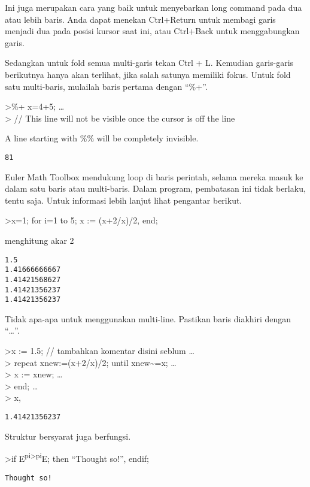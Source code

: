 \documentclass[
]{book}
\begin{document}
Ini juga merupakan cara yang baik untuk menyebarkan long command pada dua atau lebih baris. Anda dapat menekan Ctrl+Return untuk membagi garis menjadi dua pada posisi kursor saat ini, atau Ctrl+Back untuk menggabungkan garis.

Sedangkan untuk fold semua multi-garis tekan Ctrl + L. Kemudian garis-garis berikutnya hanya akan terlihat, jika salah satunya memiliki fokus. Untuk fold satu multi-baris, mulailah baris pertama dengan ``\%+''.

\textgreater\%+ x=4+5; \ldots{}\\
\textgreater{} // This line will not be visible once the cursor is off the line

A line starting with \%\% will be completely invisible.

\begin{verbatim}
81
\end{verbatim}

Euler Math Toolbox mendukung loop di baris perintah, selama mereka masuk ke dalam satu baris atau multi-baris. Dalam program, pembatasan ini tidak berlaku, tentu saja. Untuk informasi lebih lanjut lihat pengantar berikut.

\textgreater x=1; for i=1 to 5; x := (x+2/x)/2, end;

menghitung akar 2

\begin{verbatim}
1.5
1.41666666667
1.41421568627
1.41421356237
1.41421356237
\end{verbatim}

Tidak apa-apa untuk menggunakan multi-line. Pastikan baris diakhiri dengan ``\ldots{}''.

\textgreater x := 1.5; // tambahkan komentar disini seblum \ldots{}\\
\textgreater{} repeat xnew:=(x+2/x)/2; until xnew\textasciitilde=x; \ldots{}\\
\textgreater{} x := xnew; \ldots{}\\
\textgreater{} end; \ldots{}\\
\textgreater{} x,

\begin{verbatim}
1.41421356237
\end{verbatim}

Struktur bersyarat juga berfungsi.

\textgreater if E\textsuperscript{pi\textgreater pi}E; then ``Thought so!'', endif;

\begin{verbatim}
Thought so!
\end{verbatim}
\end{document}
